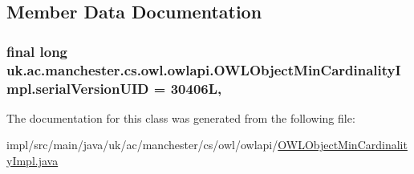 \subsection{Member Data Documentation}
\hypertarget{classuk_1_1ac_1_1manchester_1_1cs_1_1owl_1_1owlapi_1_1_o_w_l_object_min_cardinality_impl_a6c180903bffa0d1fddf1a86980fe43ff}{
\subsubsection[{serial\-Version\-U\-I\-D}]{\setlength{\rightskip}{0pt plus 5cm}final long uk.\-ac.\-manchester.\-cs.\-owl.\-owlapi.\-O\-W\-L\-Object\-Min\-Cardinality\-Impl.\-serial\-Version\-U\-I\-D = 30406\-L\hspace{0.3cm}{\ttfamily [static]}, {\ttfamily [private]}}}\label{classuk_1_1ac_1_1manchester_1_1cs_1_1owl_1_1owlapi_1_1_o_w_l_object_min_cardinality_impl_a6c180903bffa0d1fddf1a86980fe43ff}


The documentation for this class was generated from the following file\-:\begin{DoxyCompactItemize}
\item 
impl/src/main/java/uk/ac/manchester/cs/owl/owlapi/\hyperlink{_o_w_l_object_min_cardinality_impl_8java}{O\-W\-L\-Object\-Min\-Cardinality\-Impl.\-java}\end{DoxyCompactItemize}
